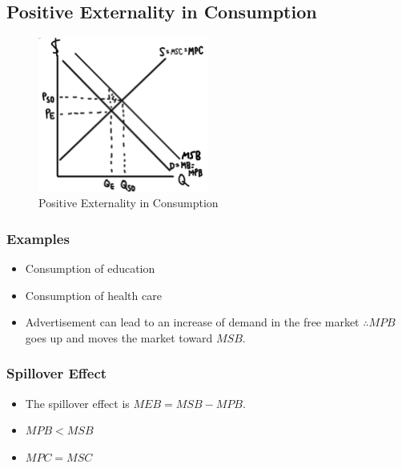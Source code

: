 \documentclass[
  letterpaper,
  DIV=11,
  numbers=noendperiod]{scrartcl}
\providecommand{\tightlist}{%
  \setlength{\itemsep}{0pt}\setlength{\parskip}{0pt}}\usepackage{longtable,booktabs,array}
\begin{document}
\subsection{Positive Externality in
Consumption}\label{positive-externality-in-consumption}

\begin{figure}[H]

{\centering \includegraphics[width=0.5\textwidth,height=\textheight]{img/pos-cons.png}

}

\caption{Positive Externality in Consumption}

\end{figure}%

\subsubsection{Examples}\label{examples-2}

\begin{itemize}
\tightlist
\item
  Consumption of education
\item
  Consumption of health care
\item
  Advertisement can lead to an increase of demand in the free market
  \(\therefore MPB\) goes up and moves the market toward \(MSB\).
\end{itemize}

\subsubsection{Spillover Effect}\label{spillover-effect}

\begin{itemize}
\tightlist
\item
  The spillover effect is \(MEB = MSB-MPB\).
\item
  \(MPB < MSB\)
\item
  \(MPC = MSC\)
\end{itemize}
\end{document}
